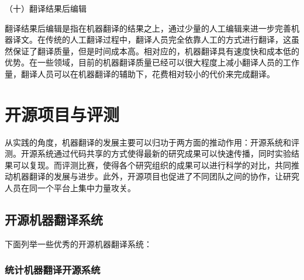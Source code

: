 \parinterval （十）翻译结果后编辑

\parinterval 翻译结果后编辑是指在机器翻译的结果之上，通过少量的人工编辑来进一步完善机器译文。在传统的人工翻译过程中，翻译人员完全依靠人工的方式进行翻译，这虽然保证了翻译质量，但是时间成本高。相对应的，机器翻译具有速度快和成本低的优势。在一些领域，目前的机器翻译质量已经可以很大程度上减小翻译人员的工作量，翻译人员可以在机器翻译的辅助下，花费相对较小的代价来完成翻译。


\sectionnewpage
\section{开源项目与评测}

\parinterval 从实践的角度，机器翻译的发展主要可以归功于两方面的推动作用：开源系统和评测。开源系统通过代码共享的方式使得最新的研究成果可以快速传播，同时实验结果可以复现。而评测比赛，使得各个研究组织的成果可以进行科学的对比，共同推动机器翻译的发展与进步。此外，开源项目也促进了不同团队之间的协作，让研究人员在同一个平台上集中力量攻关。


\subsection{开源机器翻译系统}


下面列举一些优秀的开源机器翻译系统：


\subsubsection{统计机器翻译开源系统}

